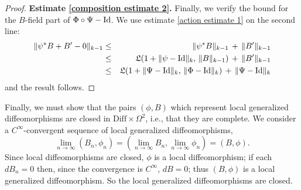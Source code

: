 \documentclass{article}
\begin{document}
\begin{proof}
\textbf{Estimate \eqref{composition estimate 2}.}  Finally, we verify the bound for the $B$-field part of ${\Phi\circ\Psi-\textrm{Id}}$.  We use estimate \eqref{action estimate 1} on the second line:
\begin{eqnarray*}
\|\psi^*B + B'-0\|_{k-1} &\leq& \|\psi^*B\|_{k-1} \,+\, \|B'\|_{k-1} \\
&\leq& \mathfrak{L}(1+\|\psi-\textrm{Id}\|_k,\, \|B\|_{k-1}) \,+\, \|B'\|_{k-1} \\
&\leq& \mathfrak{L}(1+\|\Psi-\textrm{Id}\|_k,\, \|\Phi-\textrm{Id}\|_k) \,+\, \|\Psi-\textrm{Id}\|_k
\end{eqnarray*}
and the result follows.
\end{proof}

\begin{rem}
Finally, we must show that the pairs $(\phi,B)$ which represent local generalized diffeomorphisms are closed in $\textrm{Diff} \times \Omega^2$, i.e., that they are complete.  We consider a $C^\infty$-convergent sequence of local generalized diffeomorphisms,
$$\lim_{n\to\infty} (B_n,\phi_n) = (\lim_{n\to\infty} B_n, \lim_{n\to\infty} \phi_n) = (B,\phi).$$
Since local diffeomorphisms are closed, $\phi$ is a local diffeomorphism; if each $dB_n=0$ then, since the convergence is $C^\infty$, $dB=0$; thus $(B,\phi)$ is a local generalized diffeomorphism.  So the local generalized diffeomorphisms are closed.
\end{rem}
\end{document}
